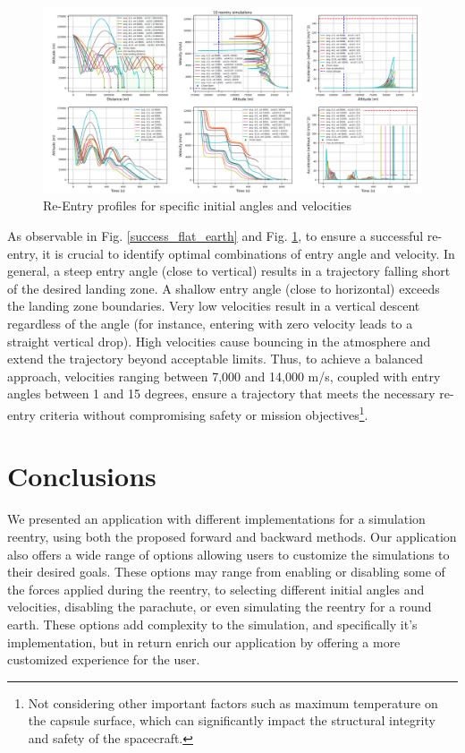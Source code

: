 \documentclass[runningheads]{llncs}
\begin{document}
\begin{figure}
\centering
\includegraphics[width=1\textwidth]{images/sim_results_sample.png}
\caption{Re-Entry profiles for specific initial angles and velocities} \label{sim_results_sample}
\end{figure}

As observable in Fig. \ref{success_flat_earth} and Fig. \ref{sim_results_sample}, to ensure a successful re-entry, it is crucial to identify optimal combinations of entry angle and velocity. In general, a steep entry angle (close to vertical) results in a trajectory falling short of the desired landing zone. A shallow entry angle (close to horizontal) exceeds the landing zone boundaries. Very low velocities result in a vertical descent regardless of the angle (for instance, entering with zero velocity leads to a straight vertical drop). High velocities cause bouncing in the atmosphere and extend the trajectory beyond acceptable limits.
Thus, to achieve a balanced approach, velocities ranging between 7,000 and 14,000 m/s, coupled with entry angles between 1 and 15 degrees, ensure a trajectory that meets the necessary re-entry criteria without compromising safety or mission objectives\footnote{Not considering other important factors such as maximum temperature on the capsule surface, which can significantly impact the structural integrity and safety of the spacecraft.}.







\section{Conclusions}
We presented an application with different implementations for a simulation reentry, using both the proposed forward and backward methods. Our application also offers a wide range of options allowing users to customize the simulations to their desired goals. These options may range from enabling or disabling some of the forces applied during the reentry, to selecting different initial angles and velocities, disabling the parachute, or even simulating the reentry for a round earth. These options add complexity to the simulation, and specifically it's implementation, but in return enrich our application by offering a more customized experience for the user.
\end{document}
